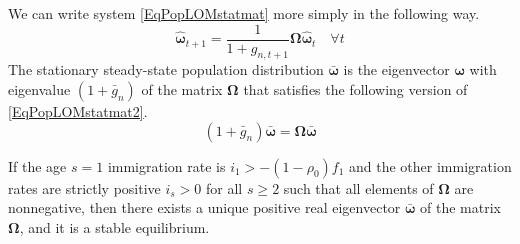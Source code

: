   We can write system \eqref{EqPopLOMstatmat} more simply in the following way.
  \begin{equation}\label{EqPopLOMstatmat2}
    \bm{\hat{\omega}}_{t+1} = \frac{1}{1+g_{n,t+1}}\bm{\Omega}\bm{\hat{\omega}}_t \quad\forall t
  \end{equation}
  The stationary steady-state population distribution $\bm{\bar{\omega}}$ is the eigenvector $\bm{\omega}$ with eigenvalue $(1+\bar{g}_n)$ of the matrix $\bm{\Omega}$ that satisfies the following version of \eqref{EqPopLOMstatmat2}.
  \begin{equation}\label{EqPopLOMss}
    (1+\bar{g}_n)\bm{\bar{\omega}} = \bm{\Omega}\bm{\bar{\omega}}
  \end{equation}

  \begin{proposition}
    If the age $s=1$ immigration rate is $i_1>-(1-\rho_0)f_1$ and the other immigration rates are strictly positive $i_s>0$ for all $s\geq 2$ such that all elements of $\bm{\Omega}$ are nonnegative, then there exists a unique positive real eigenvector $\bm{\bar{\omega}}$ of the matrix $\bm{\Omega}$, and it is a stable equilibrium.
  \end{proposition}

